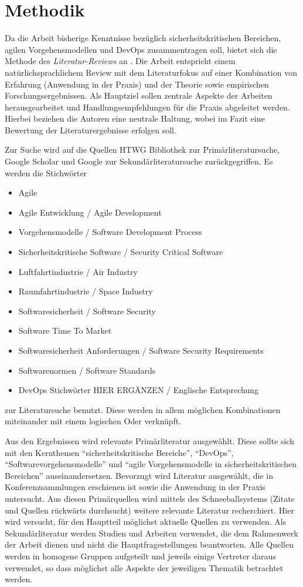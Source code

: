 \section{Methodik}

Da die Arbeit bisherige Kenntnisse bezüglich sicherheitskritischen Bereichen, agilen Vorgehensmodellen und DevOps zusammentragen soll, bietet sich die Methode des \emph{Literatur-Reviews} an \parencite[vgl.][]{Fettke:2006aa}.
Die Arbeit entspricht einem natürlichsprachlichem Review mit dem Literaturfokus auf einer Kombination von Erfahrung (Anwendung in der Praxis) und der Theorie sowie empirischen Forschungsergebnissen.
Als Hauptziel sollen zentrale Aspekte der Arbeiten herausgearbeitet und Handlungsempfehlungen für die Praxis abgeleitet werden.
Hierbei beziehen die Autoren eine neutrale Haltung, wobei im Fazit eine Bewertung der Literaturergebnisse erfolgen soll.

Zur Suche wird auf die Quellen HTWG Bibliothek \parencite[][]{HTWGaa} zur Primärliteratursuche, Google Scholar und Google zur Sekundärliteratursuche zurückgegriffen.
Es werden die Stichwörter
\begin{itemize}
\item Agile
\item Agile Entwicklung / Agile Development
\item Vorgehensmodelle / Software Development Process
\item Sicherheitskritische Software / Security Critical Software
\item Luftfahrtindustrie / Air Industry
\item Raumfahrtindustrie / Space Industry
\item Softwaresicherheit / Software Security
\item Software Time To Market
\item Softwaresicherheit Anforderungen / Software Security Requirements
\item Softwarenormen / Software Standards
\item DevOps Stichwörter HIER ERGÄNZEN / Englische Entsprechung
\end{itemize}
zur Literatursuche benutzt.
Diese werden in allem möglichen Kombinationen miteinander mit einem logischen Oder verknüpft.

Aus den Ergebnissen wird relevante Primärliteratur ausgewählt. 
Diese sollte sich mit den Kernthemen \enquote{sicherheitskritische Bereiche}, \enquote{DevOps}, \enquote{Softwarevorgehensmodelle} und \enquote{agile Vorgehensmodelle in sicherheitskritischen Bereichen} auseinandersetzen.
Bevorzugt wird Literatur ausgewählt, die in Konferenzsammlungen erschienen ist sowie die Anwendung in der Praxis untersucht.
Aus diesen Primärquellen wird mittels des Schneeballsystems (Zitate und Quellen rückwärts durchsucht) weitere relevante Literatur recherchiert.
Hier wird versucht, für den Hauptteil möglichst aktuelle Quellen zu verwenden.
Als Sekundärliteratur werden Studien und Arbeiten verwendet, die dem Rahmenwerk der Arbeit dienen und nicht die Hauptfragestellungen beantworten.
Alle Quellen werden in homogene Gruppen aufgeteilt und jeweils einige Vertreter daraus verwendet, so dass möglichst alle Aspekte der jeweiligen Thematik betrachtet werden.


